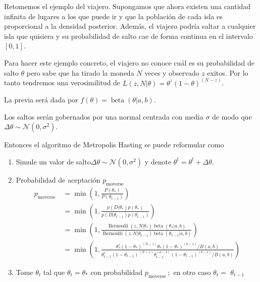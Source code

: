 \documentclass[
  12pt,
]{book}
\theoremstyle{definition}
\theoremstyle{definition}
\theoremstyle{definition}
\theoremstyle{remark}
\begin{document}
Retomemos el ejemplo del viajero. Supongamos que ahora existen una
cantidad infinita de lugares a los que puede ir y que la población de
cada isla es proporcional a la densidad posterior. Además, el viajero
podría saltar a cualquier isla que quisiera y su probabilidad de
salto cae de forma continua en el intervalo \([0,1]\).

Para hacer este ejemplo concreto, el viajero no conoce cuál es su
probabilidad de salto \(\theta\) pero sabe que ha tirado la
moneda \(N\) veces y observado \(z\) exitos. Por lo tanto tendremos
una verosimilitud de \(L(z, N | \theta)=\theta^{z}(1-\theta)^{(N-z)}\).

La previa será dada por \(f(\theta)=\operatorname{beta}(\theta | a, b)\).

Los saltos serán gobernados por una normal centrada con media
\(\sigma\) de modo que \(\Delta \theta \sim \mathcal{N}\left(0,\sigma^{2}\right)\).

Entonces el algoritmo de Metropolis Hasting se puede reformular como

\begin{enumerate}
\def\labelenumi{\arabic{enumi}.}
\item
  Simule un valor de salto\(\Delta \theta \sim \mathcal{N}\left(0,\sigma^{2}\right)\) y denote \(\theta^{t} = \theta^{t} + \Delta\theta\).
\item
  Probabilidad de aceptación \(p_{\text {moverse }}\)
  \begin{align*}
   p_{\text {moverse }}
     & =\min \left(1, \frac{P\left(\theta_{\ast}\right)}{P\left(\theta_{t-1}\right)}\right) \\
                 & =\min \left(1, \frac{p\left(D |
       \theta_{\ast}\right) p\left(\theta_{\ast}\right)}{p\left(D | \theta_{t-1}\right)
       p\left(\theta_{t-1}\right)}\right) \\
     & =\min \left(1, \frac{\operatorname{Bernoulli}\left(z, N |
       \theta_{\ast}\right)
       \operatorname{beta}\left(\theta_{\ast} | a,
       b\right)}{\operatorname{Bernoulli}\left(z, N |
       \theta_{t-1}\right)
       \operatorname{beta}\left(\theta_{t-1} | a, b\right)}\right) \\
     & =\min \left(1,
   \frac{\theta_{\ast}^{z}\left(1-\theta_{\ast}\right)^{(N-z)}
           \theta_{\ast} \left(1-\theta_{\ast}\right)^{(b-1)}
           / B(a,b)}{\theta_{t-1}^{z}\left(1-\theta_{t-1}\right)^{(N-z)}
           \theta_{t-1}^{(a-1)}\left(1-\theta_{t-1}\right)^{(b-1)}
           / B(a, b)}\right)
  \end{align*}
\item
  Tome \(\theta_{t}\) tal que \(\theta_{t}=\theta_{*}\)
  con probabilidad \(p_{\text {moverse }} ;\) en otro caso \(\theta_{t}=\) \(\theta_{t-1}\)
\end{enumerate}
\end{document}

